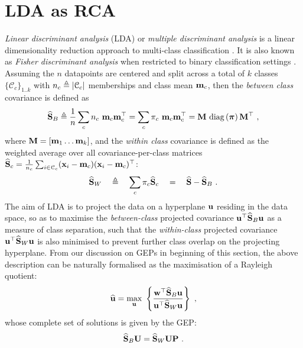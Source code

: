 
        
  \section{LDA as RCA} \label{sec:chap4_LDAasRCA}
    
      \textit{Linear discriminant analysis} (LDA) or \textit{multiple discriminant analysis} is a linear dimensionality reduction approach to multi-class classification \citep{Fukunaga:book90, Duda:Hart73}. It is also known as \textit{Fisher discriminant analysis} when restricted to binary classification settings \citep{Fisher:discrim36}. Assuming the $n$ datapoints are centered and split across a total of $k$ classes $\{\mathcal{C}_c\}_{1..k}$ with $n_c \triangleq \lvert \mathcal{C}_c \rvert$ memberships and class mean $\mathbf{m}_c$, then the \textit{between class} covariance is defined as
      \[
	\widehat{\mathbf{S}}_B \triangleq \frac{1}{n} \sum_{c} n_c ~ \mathbf{m}_c \mathbf{m}_c^\top = \sum_{c} \pi_c ~ \mathbf{m}_c \mathbf{m}_c^\top = \mathbf{M} ~\textrm{diag}\left( \boldsymbol{\pi} \right) \mathbf{M}^\top ~,
      \]
      where $\mathbf{M} = [\mathbf{m}_1 \dots \mathbf{m}_k]$, and the \textit{within class} covariance is defined as the weighted average over all covariance-per-class matrices $\widehat{\mathbf{S}}_c = \frac{1}{n_c} \sum_{i \in \mathcal{C}_c} (\mathbf{x}_i - \mathbf{m}_c)(\mathbf{x}_i - \mathbf{m}_c)^\top$:
      \[
	\widehat{\mathbf{S}}_W \quad \triangleq \quad \sum_{c} \pi_c \widehat{\mathbf{S}}_c \quad = \quad \widehat{\mathbf{S}} - \widehat{\mathbf{S}}_B ~.
      \]
      The aim of LDA is to project the data on a hyperplane $\mathbf{u}$ residing in the data space, so as to maximise the \textit{between-class} projected covariance $\mathbf{u}^\top \widehat{\mathbf{S}}_B \mathbf{u}$ as a measure of class separation, such that the \textit{within-class} projected covariance $\mathbf{u}^\top \widehat{\mathbf{S}}_W \mathbf{u}$ is also minimised to prevent further class overlap on the projecting hyperplane. From our discussion on GEPs in beginning of this section, the above description can be naturally formalised as the maximisation of a Rayleigh quotient:
      \begin{equation*} \label{equ:chap4_LDA_Rayleigh}
	\widehat{\mathbf{u}} = \underset{ \mathbf{u} }{ \textrm{max} } ~ \left\{ \frac{ \mathbf{w}^\top \widehat{\mathbf{S}}_B \mathbf{u} }{ \mathbf{u}^\top \widehat{\mathbf{S}}_W \mathbf{u} } \right\} ~,
      \end{equation*}
      whose complete set of solutions is given by the GEP:
      \begin{equation} \label{equ:chap4_LDA_GEP}
	\widehat{\mathbf{S}}_B \mathbf{U} = \widehat{\mathbf{S}}_W \mathbf{U} \mathbf{P} ~.
      \end{equation}

